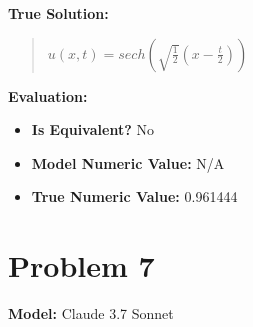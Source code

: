 \documentclass{article}
\begin{document}
\textbf{True Solution:}
\begin{quote}
$u(x, t) = sech(\sqrt{\frac{1}{2}} (x-\frac{t}{2}))$
\end{quote}

\textbf{Evaluation:}
\begin{itemize}
\item \textbf{Is Equivalent?} No
\item \textbf{Model Numeric Value:} N/A
\item \textbf{True Numeric Value:} 0.961444
\end{itemize}
\vspace{1cm}
\section*{Problem 7}
\textbf{Model:} Claude 3.7 Sonnet
\end{document}
